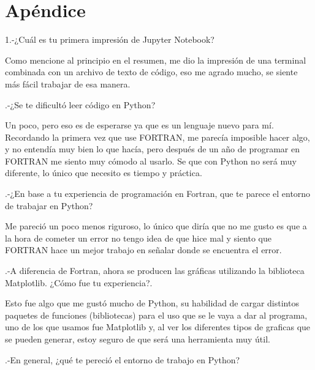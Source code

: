 \documentclass{article}
\begin{document}
\section{Apéndice}

 

    1.-¿Cuál es tu primera impresión de Jupyter Notebook?
    
    \vspace{0.3cm}
    Como mencione al principio en el resumen, me dio la impresión de una terminal combinada con un archivo de texto de código, eso me agrado mucho, se siente más fácil trabajar de esa manera.
    \vspace{0.3cm}
    
.-¿Se te dificultó leer código en Python?
    
    \vspace{0.3cm}
    Un poco, pero eso es de esperarse ya que es un lenguaje nuevo para mí. Recordando la primera vez que use FORTRAN, me parecía imposible hacer algo, y no entendía muy bien lo que hacía, pero después de un año de programar en FORTRAN me siento muy cómodo al usarlo. Se que con Python no será muy diferente, lo único que necesito es tiempo y práctica.
    \vspace{0.3cm}
    
.-¿En base a tu experiencia de programación en Fortran, que te parece el entorno de trabajar en Python?
    
    \vspace{0.3cm}
    Me pareció un poco menos riguroso, lo único que diría que no me gusto es que a la hora de cometer un error no tengo idea de que hice mal y siento que FORTRAN hace un mejor trabajo en señalar donde se encuentra el error.
    \vspace{0.3cm}
    
.-A diferencia de Fortran, ahora se producen las gráficas utilizando la biblioteca Matplotlib. ¿Cómo fue tu experiencia?. 
    
    \vspace{0.3cm}
    Esto fue algo que me gustó mucho de Python, su habilidad de cargar distintos paquetes de funciones (bibliotecas) para el uso que se le vaya a dar al programa, uno de los que usamos fue Matplotlib y, al ver los diferentes tipos de graficas que se pueden generar, estoy seguro de que será una herramienta muy útil.
    \vspace{0.3cm}
    
.-En general, ¿qué te pereció el entorno de trabajo en Python? 
    
\end{document}
